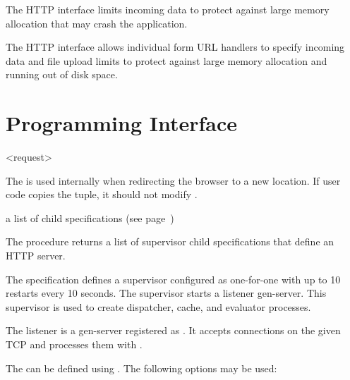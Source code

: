 The HTTP interface limits incoming data to protect against large
memory allocation that may crash the application.

The HTTP interface allows individual form URL handlers to specify
incoming data and file upload limits to protect against large memory
allocation and running out of disk space.

\section {Programming Interface}

\begin{tupledef}{<request>}
\end{tupledef}

The  is used internally when redirecting the
browser to a new location. If user code copies the 
tuple, it should not modify .

\begin{procedure}
\end{procedure}
\returns{} a list of child specifications (see page~\pageref{page:child-spec})

\begin{argtbl}
\end{argtbl}

The  procedure returns a list of
supervisor child specifications that define an HTTP server.

The specification defines a supervisor configured as one-for-one with
up to 10 restarts every 10 seconds. The supervisor starts a listener
gen-server. This supervisor is used to create dispatcher, cache,
and evaluator processes.

The listener is a gen-server registered as . It accepts
connections on the given TCP  and processes them with
.

The  can be defined using . The following options may be
used:

